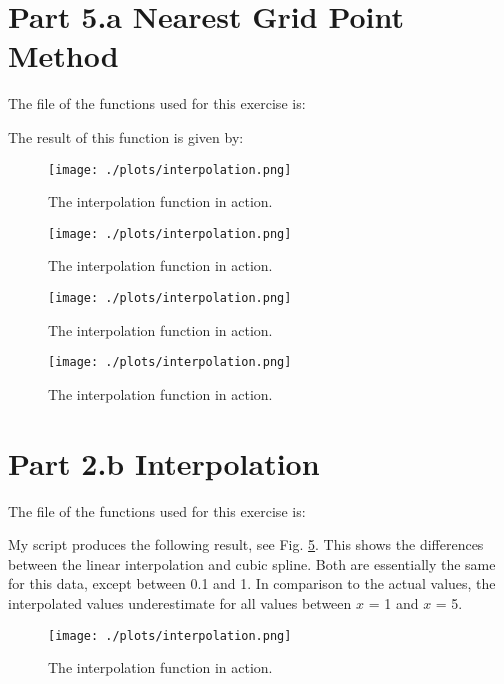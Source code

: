\section{Part 5.a Nearest Grid Point Method}

The file of the functions used for this exercise is:



The result of this function is given by:

\begin{figure}[h!]
  \centering
  \texttt{[image: ./plots/interpolation.png]}
  \caption{The interpolation function in action.}
  \label{fig:54}
\end{figure}

\begin{figure}[h!]
  \centering
  \texttt{[image: ./plots/interpolation.png]}
  \caption{The interpolation function in action.}
  \label{fig:59}
\end{figure}

\begin{figure}[h!]
  \centering
  \texttt{[image: ./plots/interpolation.png]}
  \caption{The interpolation function in action.}
  \label{fig:511}
\end{figure}

\begin{figure}[h!]
  \centering
  \texttt{[image: ./plots/interpolation.png]}
  \caption{The interpolation function in action.}
  \label{fig:514}
\end{figure}


\section{Part 2.b Interpolation}

The file of the functions used for this exercise is:



My script produces the following result, see Fig. \ref{fig:interp}. This shows the differences between the linear
interpolation and cubic spline. Both are essentially the same for this data, except between 0.1 and 1. In comparison to
the actual values, the interpolated values underestimate for all values between $x$ = 1 and $x$ = 5.

\begin{figure}[h!]
  \centering
  \texttt{[image: ./plots/interpolation.png]}
  \caption{The interpolation function in action.}
  \label{fig:interp}
\end{figure}

